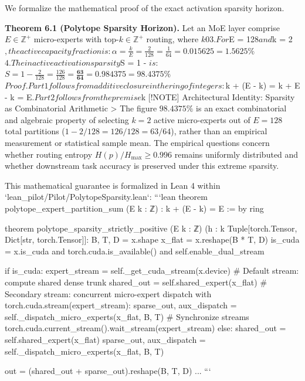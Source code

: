 \documentclass[11pt,twoside,openright]{amsbook}
\begin{document}
{{{{{{{{We formalize the mathematical proof of the exact activation sparsity horizon.

\textbf{Theorem 6.1 (Polytope Sparsity Horizon).} Let an MoE layer comprise $E \in \mathbb{Z}^+$ micro-experts with top-$k \in \mathbb{Z}^+$ routing, where $k  0$$
3. For $E = 128$ and $k = 2$, the active capacity fraction is:
   $$\alpha = \frac{k}{E} = \frac{2}{128} = \frac{1}{64} = 0.015625 = 1.5625\%$$
4. The inactive activation sparsity $S = 1 - \alpha$ is:
   $$S = 1 - \frac{2}{128} = \frac{126}{128} = \frac{\mathbf{63}}{\mathbf{64}} = \mathbf{0.984375} = \mathbf{98.4375\%}$$

\textit{Proof.}
Part 1 follows from additive closure in the ring of integers: $k + (E - k) = k + E - k = E$.
Part 2 follows from the premise $k  [!NOTE] Architectural Identity: Sparsity as Combinatorial Arithmetic
> The figure \textbf{$98.4375\%$} is an exact combinatorial and algebraic property of selecting $k = 2$ active micro-experts out of $E = 128$ total partitions ($1 - 2/128 = 126/128 = 63/64$), rather than an empirical measurement or statistical sample mean. The empirical questions concern whether routing entropy $H(p) / H_{\max} \ge 0.996$ remains uniformly distributed and whether downstream task accuracy is preserved under this extreme sparsity.

This mathematical guarantee is formalized in Lean 4 within `lean_pilot/Pilot/PolytopeSparsity.lean`:
```lean
theorem polytope_expert_partition_sum (E k : ℤ) :
    k + (E - k) = E := by
  ring

theorem polytope_sparsity_strictly_positive (E k : ℤ) (h : k  Tuple[torch.Tensor, Dict[str, torch.Tensor]]:
    B, T, D = x.shape
    x_flat = x.reshape(B * T, D)
    is_cuda = x.is_cuda and torch.cuda.is_available() and self.enable_dual_stream

    if is_cuda:
        expert_stream = self._get_cuda_stream(x.device)
        # Default stream: compute shared dense trunk
        shared_out = self.shared_expert(x_flat)
        # Secondary stream: concurrent micro-expert dispatch
        with torch.cuda.stream(expert_stream):
            sparse_out, aux_dispatch = self._dispatch_micro_experts(x_flat, B, T)
        # Synchronize streams
        torch.cuda.current_stream().wait_stream(expert_stream)
    else:
        shared_out = self.shared_expert(x_flat)
        sparse_out, aux_dispatch = self._dispatch_micro_experts(x_flat, B, T)

    out = (shared_out + sparse_out).reshape(B, T, D)
    ...
```

}}}}}}}}
\end{document}
